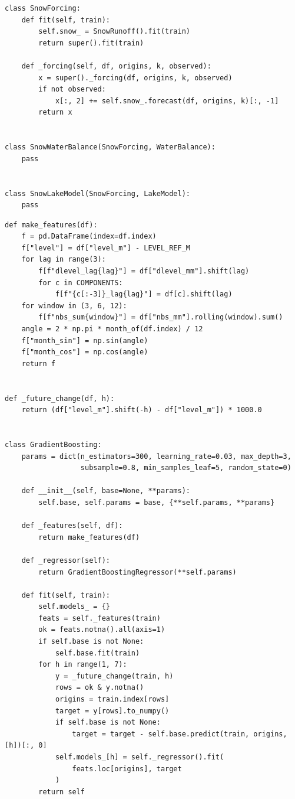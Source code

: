 \documentclass{article}
\begin{document}
\begin{lstlisting}[caption={Snowpack model}]
class SnowForcing:
    def fit(self, train):
        self.snow_ = SnowRunoff().fit(train)
        return super().fit(train)

    def _forcing(self, df, origins, k, observed):
        x = super()._forcing(df, origins, k, observed)
        if not observed:
            x[:, 2] += self.snow_.forecast(df, origins, k)[:, -1]
        return x


class SnowWaterBalance(SnowForcing, WaterBalance):
    pass


class SnowLakeModel(SnowForcing, LakeModel):
    pass
\end{lstlisting}

\begin{lstlisting}[caption={Features, gradient boosting, the linear regression, the tuned settings and the hybrid}]
def make_features(df):
    f = pd.DataFrame(index=df.index)
    f["level"] = df["level_m"] - LEVEL_REF_M
    for lag in range(3):
        f[f"dlevel_lag{lag}"] = df["dlevel_mm"].shift(lag)
        for c in COMPONENTS:
            f[f"{c[:-3]}_lag{lag}"] = df[c].shift(lag)
    for window in (3, 6, 12):
        f[f"nbs_sum{window}"] = df["nbs_mm"].rolling(window).sum()
    angle = 2 * np.pi * month_of(df.index) / 12
    f["month_sin"] = np.sin(angle)
    f["month_cos"] = np.cos(angle)
    return f


def _future_change(df, h):
    return (df["level_m"].shift(-h) - df["level_m"]) * 1000.0


class GradientBoosting:
    params = dict(n_estimators=300, learning_rate=0.03, max_depth=3,
                  subsample=0.8, min_samples_leaf=5, random_state=0)

    def __init__(self, base=None, **params):
        self.base, self.params = base, {**self.params, **params}

    def _features(self, df):
        return make_features(df)

    def _regressor(self):
        return GradientBoostingRegressor(**self.params)

    def fit(self, train):
        self.models_ = {}
        feats = self._features(train)
        ok = feats.notna().all(axis=1)
        if self.base is not None:
            self.base.fit(train)
        for h in range(1, 7):
            y = _future_change(train, h)
            rows = ok & y.notna()
            origins = train.index[rows]
            target = y[rows].to_numpy()
            if self.base is not None:
                target = target - self.base.predict(train, origins, [h])[:, 0]
            self.models_[h] = self._regressor().fit(
                feats.loc[origins], target
            )
        return self


\end{lstlisting}
\end{document}
